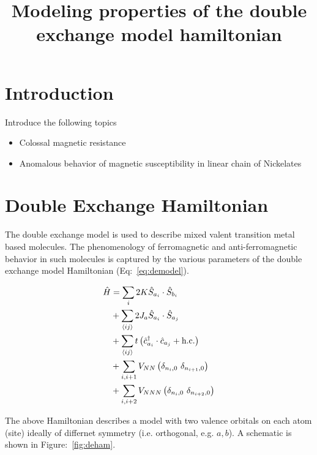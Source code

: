 \documentclass[ openright,titlepage,numbers=noenddot,headinclude,twoside,%
                footinclude=true,cleardoublepage=empty,abstractoff,%
                BCOR=5mm,paper=a4,fontsize=11pt,%
                ngerman,american,%
]{scrreprt}
\title{Modeling properties of the double exchange model hamiltonian}
\begin{document}
\maketitle
\thispagestyle{fancy}
\chapter{Introduction}

Introduce the following topics
\begin{itemize}
  \item Colossal magnetic resistance
  \item Anomalous behavior of magnetic susceptibility in linear chain of Nickelates
\end{itemize}

\chapter{Double Exchange Hamiltonian}

The double exchange model is used to describe mixed valent transition
metal based molecules. The phenomenology of ferromagnetic and anti-ferromagnetic
behavior in such molecules is captured by the various parameters of the
double exchange model Hamiltonian (Eq:~\ref{eq:demodel}).

\begin{equation}
  \begin{split}
\hat{H} &= \sum_i 2K \hat{S}_{a_i}\cdot\hat{S}_{b_i} \\
        &+ \sum_{\braket{ij}} 2J_a \hat{S}_{a_i}\cdot\hat{S}_{a_j} \\
        &+ \sum_{\braket{ij}} t\left( \hat{c}^{\dagger}_{a_i}\cdot\hat{c}_{a_j} + \text{h.c.}\right ) \\
        &+ \sum_{i,i+1} V_{NN}\left ( \delta_{n_i,0}\ \delta_{n_{i+1},0} \right ) \\
        &+ \sum_{i,i+2} V_{NNN}\left ( \delta_{n_i,0}\ \delta_{n_{i+2},0} \right )
  \end{split}
\label{eq:demodel}
\end{equation}

The above Hamiltonian describes a model with two valence orbitals on each
atom (site) ideally of differnet symmetry (i.e. orthogonal, e.g. $a,b$). A schematic is shown in
Figure:~\ref{fig:deham}.
\end{document}
